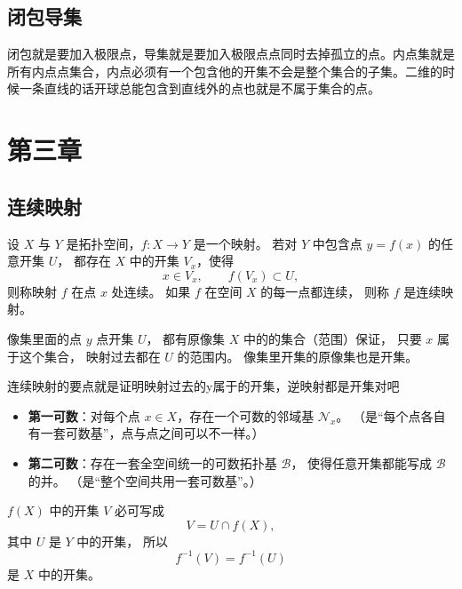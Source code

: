\section{闭包导集}
\begin{note}
    闭包就是要加入极限点，导集就是要加入极限点点同时去掉孤立的点。内点集就是所有内点点集合，内点必须有一个包含他的开集不会是整个集合的子集。二维的时候一条直线的话开球总能包含到直线外的点也就是不属于集合的点。
\end{note}
\chapter{第三章}
\section{连续映射}
\begin{definition}[连续映射]
设 $X$ 与 $Y$ 是拓扑空间，$f:X\to Y$ 是一个映射。
若对 $Y$ 中包含点 $y=f(x)$ 的任意开集 $U$，
都存在 $X$ 中的开集 $V_x$，使得
\[
x\in V_x,\qquad f(V_x)\subset U,
\]
则称映射 $f$ 在点 $x$ 处连续。
如果 $f$ 在空间 $X$ 的每一点都连续，
则称 $f$ 是连续映射。
\end{definition}

\begin{dxtips}
像集里面的点 $y$ 点开集 $U$，
都有原像集 $X$ 中的的集合（范围）保证，
只要 $x$ 属于这个集合，
映射过去都在 $U$ 的范围内。
像集里开集的原像集也是开集。
\end{dxtips}
\begin{dxtips}
    连续映射的要点就是证明映射过去的y属于的开集，逆映射都是开集对吧
\end{dxtips}
\begin{itemize}
  \item \textbf{第一可数}：对每个点 $x\in X$，存在一个可数的邻域基 $\mathcal N_x$。  
  （是“每个点各自有一套可数基”，点与点之间可以不一样。）

  \item \textbf{第二可数}：存在一套全空间统一的可数拓扑基 $\mathcal B$，
  使得任意开集都能写成 $\mathcal B$ 的并。  
  （是“整个空间共用一套可数基”。）
\end{itemize}
\begin{dxtips}[子空间重要步骤]
    $f(X)$ 中的开集 $V$ 必可写成
\[
V = U \cap f(X),
\]
其中 $U$ 是 $Y$ 中的开集，
所以
\[
f^{-1}(V) = f^{-1}(U)
\]
是 $X$ 中的开集。
\end{dxtips}
